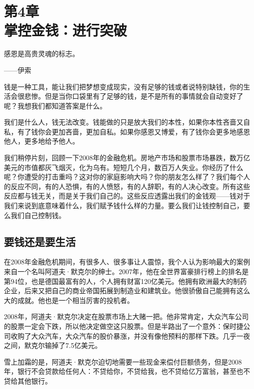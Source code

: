 
\section[第4章\q 掌控金钱：进行突破]{第4章\\ 掌控金钱：进行突破}

\begin{BookQuote}
感恩是高贵灵魂的标志。

\hfill ——伊索
\end{BookQuote}

钱是一种工具，能让我们把梦想变成现实，没有足够的钱或者说特别缺钱，你的生活会很悲惨。但是当你口袋里有了足够的钱，是不是所有的事情就会自动变好了呢？我想我们都知道答案是什么。

我们是什么人，钱无法改变。钱能做的只是放大我们的本性，如果你本性吝啬又自私，有了钱你会更加吝啬，更加自私。如果你感恩又博爱，有了钱你会更多地感恩他人，更多地给予他人。

我们稍停片刻，回顾一下2008年的金融危机。房地产市场和股票市场暴跌，数万亿美元的市值都灰飞烟灭，化为乌有。短短几个月，数百万人失业。你经历了什么呢？你遭受的打击重吗？这对你的家庭影响大吗？你的朋友怎么样了？我们每个人的反应不同，有的人恐惧，有的人愤怒，有的人辞职，有的人决心改变。所有这些反应都与钱无关，而是关于我们自己的。这些反应透露出我们的金钱观——钱对于我们来说到底意味着什么，我们赋予钱什么样的力量。要么我们让钱控制自己，要么我们自己控制钱。

\subsection{要钱还是要生活}

在2008年金融危机期间，有很多人、很多事让人震惊，我个人认为影响最大的案例来自一个名叫阿道夫·默克尔的绅士。2007年，他在全世界富豪排行榜上的排名是第94位，也是德国最富有的人，个人拥有财富120亿美元。他拥有欧洲最大的制药企业，后来又把自己的商业帝国拓展到制造业和建筑业。他很骄傲自己能拥有这么大的成就。他也是一个相当厉害的投机者。

2008年，阿道夫·默克尔决定在股票市场上大赌一把。他非常肯定，大众汽车公司的股票一定会下跌，所以他决定做空这只股票。但是半路出了一个意外：保时捷公司收购了大众汽车，大众汽车的股价暴涨，并没有像他预料的那样下跌。几乎一夜之间，默克尔输掉了7.5亿美元。

雪上加霜的是，阿道夫·默克尔迫切地需要一些现金来偿付巨额债务，但是2008年，银行不会贷款给任何人：不贷给你，不贷给我，也不贷给亿万富翁，甚至也不贷给其他银行。

